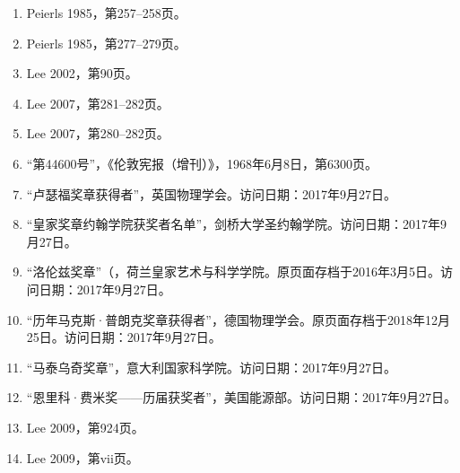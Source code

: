 \begin{enumerate}
\item Peierls 1985，第257–258页。
\item Peierls 1985，第277–279页。
\item Lee 2002，第90页。
\item Lee 2007，第281–282页。
\item Lee 2007，第280–282页。
\item “第44600号”，《伦敦宪报（增刊）》，1968年6月8日，第6300页。
\item “卢瑟福奖章获得者”，英国物理学会。访问日期：2017年9月27日。
\item “皇家奖章约翰学院获奖者名单”，剑桥大学圣约翰学院。访问日期：2017年9月27日。
\item “洛伦兹奖章”（，荷兰皇家艺术与科学学院。原页面存档于2016年3月5日。访问日期：2017年9月27日。
\item “历年马克斯·普朗克奖章获得者”，德国物理学会。原页面存档于2018年12月25日。访问日期：2017年9月27日。
\item “马泰乌奇奖章”，意大利国家科学院。访问日期：2017年9月27日。
\item “恩里科·费米奖——历届获奖者”，美国能源部。访问日期：2017年9月27日。
\item Lee 2009，第924页。
\item Lee 2009，第vii页。
\end{enumerate}
